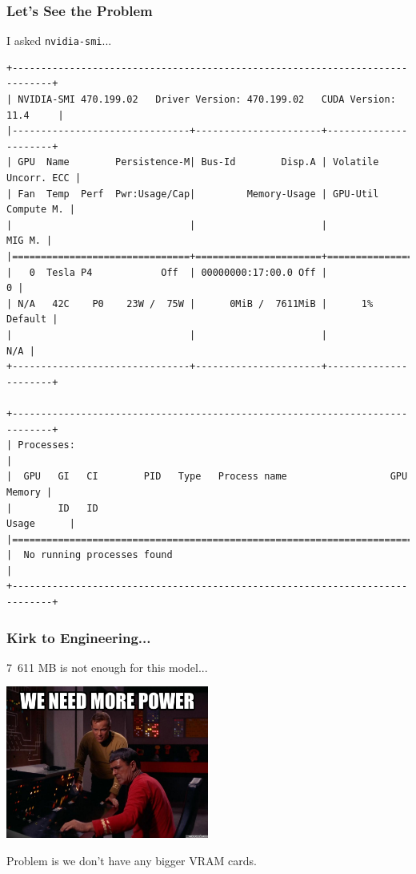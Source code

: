 \begin{frame}[fragile]
\frametitle{Let's See the Problem}
I asked \texttt{nvidia-smi}...

{\scriptsize
\begin{verbatim}
+-----------------------------------------------------------------------------+
| NVIDIA-SMI 470.199.02   Driver Version: 470.199.02   CUDA Version: 11.4     |
|-------------------------------+----------------------+----------------------+
| GPU  Name        Persistence-M| Bus-Id        Disp.A | Volatile Uncorr. ECC |
| Fan  Temp  Perf  Pwr:Usage/Cap|         Memory-Usage | GPU-Util  Compute M. |
|                               |                      |               MIG M. |
|===============================+======================+======================|
|   0  Tesla P4            Off  | 00000000:17:00.0 Off |                    0 |
| N/A   42C    P0    23W /  75W |      0MiB /  7611MiB |      1%      Default |
|                               |                      |                  N/A |
+-------------------------------+----------------------+----------------------+
                                                                               
+-----------------------------------------------------------------------------+
| Processes:                                                                  |
|  GPU   GI   CI        PID   Type   Process name                  GPU Memory |
|        ID   ID                                                   Usage      |
|=============================================================================|
|  No running processes found                                                 |
+-----------------------------------------------------------------------------+
\end{verbatim}
}


\end{frame}

\begin{frame}
\frametitle{Kirk to Engineering...}

7~611 MB is not enough for this model...

\begin{center}
	\includegraphics[width=0.5\textwidth]{images/morepower.png}
\end{center}

Problem is we don't have any bigger VRAM cards.

\end{frame}

